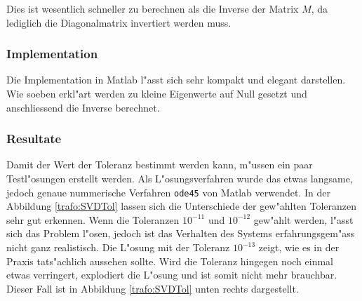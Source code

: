 \begin{refsection}
Dies ist wesentlich schneller zu berechnen als die Inverse der Matrix $M$, da lediglich die Diagonalmatrix invertiert werden muss.

\subsubsection{Implementation \label{trafo:SVD}}
Die Implementation in Matlab l"asst sich sehr kompakt und elegant darstellen. Wie soeben erkl"art werden zu kleine Eigenwerte auf Null gesetzt und anschliessend die Inverse berechnet. 

{\scriptsize }

\subsubsection{Resultate}
Damit der Wert der Toleranz bestimmt werden kann, m"ussen ein paar Testl"osungen erstellt werden. Als L"osungsverfahren wurde das etwas langsame, jedoch genaue nummerische Verfahren \texttt{ode45} von Matlab verwendet. In der Abbildung \ref{trafo:SVDTol} lassen sich die Unterschiede der gew"ahlten Toleranzen sehr gut erkennen. Wenn die Toleranzen $10^{-11}$ und $10^{-12}$ gew"ahlt werden, l"asst sich das Problem l"osen, jedoch ist das Verhalten des Systems erfahrungsgem"ass nicht ganz realistisch. Die L"osung mit der Toleranz $10^{-13}$ zeigt, wie es in der Praxis tats"achlich aussehen sollte. Wird die Toleranz hingegen noch einmal etwas verringert, explodiert die L"osung und ist somit nicht mehr brauchbar. Dieser Fall ist in Abbildung \ref{trafo:SVDTol} unten rechts dargestellt.


\end{refsection}
